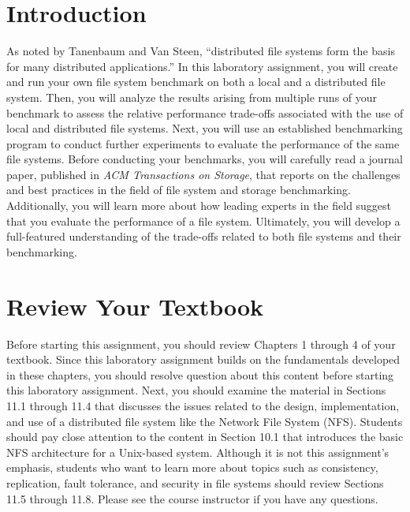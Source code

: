 

\usepackage[compact]{titlesec}
\usepackage{hologo}



\section*{Introduction}

As noted by Tanenbaum and Van Steen, ``distributed file systems form the basis for many distributed applications.'' In
this laboratory assignment, you will create and run your own file system benchmark on both a local and a distributed
file system. Then, you will analyze the results arising from multiple runs of your benchmark to assess the relative
performance trade-offs associated with the use of local and distributed file systems. Next, you will use an established
benchmarking program to conduct further experiments to evaluate the performance of the same file systems. Before
conducting your benchmarks, you will carefully read a journal paper, published in {\em ACM Transactions on Storage},
that reports on the challenges and best practices in the field of file system and storage benchmarking. Additionally,
you will learn more about how leading experts in the field suggest that you evaluate the performance of a file system.
Ultimately, you will develop a full-featured understanding of the trade-offs related to both file systems and their
benchmarking.

\section*{Review Your Textbook}

Before starting this assignment, you should review Chapters 1 through 4 of your textbook. Since this laboratory
assignment builds on the fundamentals developed in these chapters, you should resolve question about this content before
starting this laboratory assignment. Next, you should examine the material in Sections 11.1 through 11.4 that discusses
the issues related to the design, implementation, and use of a distributed file system like the Network File System
(NFS). Students should pay close attention to the content in Section 10.1 that introduces the basic NFS architecture for
a Unix-based system. Although it is not this assignment's emphasis, students who want to learn more about topics such as
consistency, replication, fault tolerance, and security in file systems should review Sections 11.5 through 11.8.
Please see the course instructor if you have any questions.

